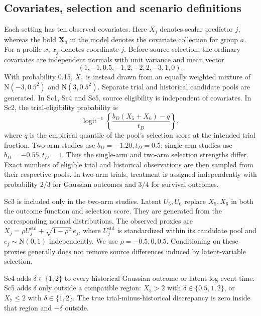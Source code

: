 \documentclass[11pt]{article}
\newcommand{\N}{\mathrm{N}}
\theoremstyle{remark}\newtheorem{remark}{Remark}[section]
\providecommand{\DIFaddtex}[1]{{\protect\color{blue} \sf #1}} %
\providecommand{\DIFaddbegin}{} %
\providecommand{\DIFaddend}{} %
\providecommand{\DIFadd}[1]{\texorpdfstring{\DIFaddtex{#1}}{#1}} %
\begin{document}
\DIFaddend \subsection{Covariates, selection and scenario definitions}\label{sec:E.1}
Each setting has ten observed covariates. Here $X_j$ denotes scalar predictor $j$, whereas the bold $\mathbf{X}_a$ in the model denotes the covariate collection for group $a$. For a profile $x$, $x_j$ denotes coordinate $j$. Before source selection, the ordinary covariates are independent normals with unit variance and mean vector
\begin{equation}
(1,-1,0.5,-1,2,-2,2,-3,1,0).
\end{equation}
With probability 0.15, $X_1$ is instead drawn from an equally weighted mixture of $\N(-3,0.5^2)$ and $\N(3,0.5^2)$. Separate trial and historical candidate pools are generated. In Sc1, Sc4 and Sc5, source eligibility is independent of covariates. In Sc2, the trial-eligibility probability is
\begin{equation}\label{eq:select}
\operatorname{logit}^{-1}\left\{\frac{b_D(X_5+X_6)-q}{t_D}\right\},
\end{equation}
where $q$ is the empirical quantile of the pool's selection score at the intended trial fraction. Two-arm studies use $b_D=-1.20,t_D=0.5$; single-arm studies use $b_D=-0.55,t_D=1$. Thus the single-arm and two-arm selection strengths differ. Exact numbers of eligible trial and historical observations are then sampled from their respective pools. In two-arm trials, treatment is assigned independently with  \DIFaddbegin \DIFadd{probability $2/3$ for Gaussian outcomes and $3/4$ for survival outcomes.
}\DIFaddend 

Sc3 is included only in the two-arm studies. Latent $U_5,U_6$ replace $X_5,X_6$ in both the outcome function and selection score. They are generated from the corresponding normal distributions. The observed proxies are $X_j=\rho U_j^{\mathrm{std}}+\sqrt{1-\rho^2}\,e_j$, where $U_j^{\mathrm{std}}$ is standardized within its candidate pool and $e_j\sim\N(0,1)$ independently. We use $\rho=-0.5,0,0.5$. Conditioning on these proxies generally does not remove source differences induced by latent-variable selection.

Sc4 adds $\delta\in\{1,2\}$ to every historical Gaussian outcome or latent log event time. Sc5 adds $\delta$ only outside a compatible region: $X_5>2$ with $\delta\in\{0.5,1,2\}$, or $X_7\leq2$ with $\delta\in\{1,2\}$. The true trial-minus-historical discrepancy is zero inside that region and $-\delta$ outside. 
\end{document}
